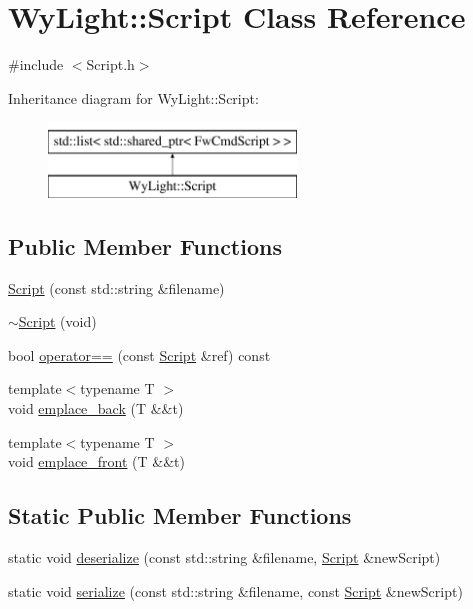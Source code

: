 \hypertarget{class_wy_light_1_1_script}{\section{Wy\-Light\-:\-:Script Class Reference}
\label{class_wy_light_1_1_script}
}


{\ttfamily \#include $<$Script.\-h$>$}

Inheritance diagram for Wy\-Light\-:\-:Script\-:\begin{figure}[H]
\begin{center}
\leavevmode
\includegraphics[height=2.000000cm]{class_wy_light_1_1_script}
\end{center}
\end{figure}
\subsection*{Public Member Functions}
\begin{DoxyCompactItemize}
\item 
\hyperlink{class_wy_light_1_1_script_a118aa641ff504296358639f105f2a449}{Script} (const std\-::string \&filename)
\item 
\hyperlink{class_wy_light_1_1_script_a9a6123b341e1b89fadae124f39f3a5c6}{$\sim$\-Script} (void)
\item 
bool \hyperlink{class_wy_light_1_1_script_afe14e21b96af672eed7fd8e10cba17ec}{operator==} (const \hyperlink{class_wy_light_1_1_script}{Script} \&ref) const 
\item 
{\footnotesize template$<$typename T $>$ }\\void \hyperlink{class_wy_light_1_1_script_af7fffcdda2a17b0e95aff472d558eb55}{emplace\-\_\-back} (T \&\&t)
\item 
{\footnotesize template$<$typename T $>$ }\\void \hyperlink{class_wy_light_1_1_script_ae9281ecb2099821ff0c5420590205676}{emplace\-\_\-front} (T \&\&t)
\end{DoxyCompactItemize}
\subsection*{Static Public Member Functions}
\begin{DoxyCompactItemize}
\item 
static void \hyperlink{class_wy_light_1_1_script_a3f1f1dc5f3c66572ba32ddb2c30c92a7}{deserialize} (const std\-::string \&filename, \hyperlink{class_wy_light_1_1_script}{Script} \&new\-Script)
\item 
static void \hyperlink{class_wy_light_1_1_script_a9d9ea9b2dc8642321f6d5f39cab82870}{serialize} (const std\-::string \&filename, const \hyperlink{class_wy_light_1_1_script}{Script} \&new\-Script)
\end{DoxyCompactItemize}


